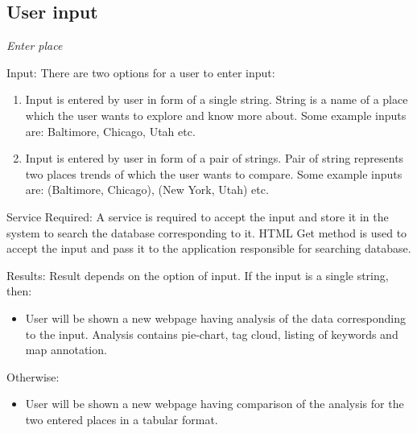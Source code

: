 \documentclass[conference]{IEEEtran}
\begin{document}
%

\subsection{User input}

\textit{Enter place}

Input: There are two options for a user to enter input:

\begin{enumerate}
\item Input is entered by user in form of a single string. String is a name of a place which the user wants to explore and know more about. Some example inputs are: Baltimore, Chicago, Utah etc. 
\item Input is entered by user in form of a pair of strings. Pair of string represents two places trends of which the user wants to compare. Some example inputs are: (Baltimore, Chicago), (New York, Utah) etc.
\end{enumerate}

Service Required: A service is required to accept the input and store it in the system to search the database corresponding to it. HTML Get method is used to accept the input and pass it to the application responsible for searching database.

Results: Result depends on the option of input. If the input is a single string, then:
\begin{itemize}
\item User will be shown a new webpage having analysis of the data corresponding to the input. Analysis contains pie-chart, tag cloud, listing of keywords and map annotation.
\end{itemize}

Otherwise:
\begin{itemize}
\item User will be shown a new webpage having comparison of the analysis for the two entered places in a tabular format.
\end{itemize}
\end{document}
